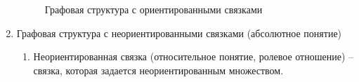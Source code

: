 \documentclass[a4paper]{article}
\begin{document}
\begin{enumerate}
\begin{figure}[!ht]
      \caption{Графовая структура с ориентированными связками}
    \end{figure}
\newpage
  \item Графовая структура с неориентированными связками (абсолютное понятие)
    \begin{enumerate}
      \item Неориентированная связка (относительное понятие, ролевое отношение) – связка, которая задается неориентированным множеством. 
    \end{enumerate}
    \begin{figure}[!ht]

\end{figure}
\end{enumerate}
\end{document}
